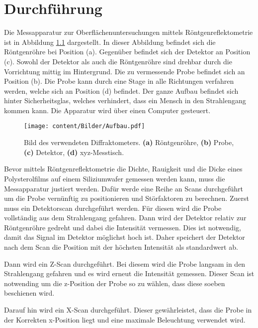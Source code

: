 \chapter{Durchführung}
\label{cha:Durchführung}

Die Messapparatur zur Oberflächenuntersuchungen mittels Röntgenreflektometrie ist in Abbildung \ref{fig:Aufbau} dargestellt. In dieser Abbildung befindet sich die Röntgenröhre bei 
Position (a). Gegenüber befindet sich der Detektor an Position (c). Sowohl der Detektor als auch die Röntgenröhre sind drehbar durch die Vorrichtung mittig im Hintergrund. 
Die zu vermessende Probe befindet sich an Position (b). Die Probe kann durch eine Stage in alle Richtungen verfahren werden, welche sich an Position (d) befindet. Der ganze Aufbau 
befindet sich hinter Sicherheitsglas, welches verhindert, dass ein Mensch in den Strahlengang kommen kann. Die Apparatur wird über einen Computer gesteuert.  

\begin{figure}
    \centering
    \texttt{[image: content/Bilder/Aufbau.pdf]}
    \caption{Bild des verwendeten Diffraktometers. \textbf{(a)} Röntgenröhre, \textbf{(b)} Probe, \textbf{(c)} Detektor, \textbf{(d)} xyz-Messtisch.}
    \label{fig:Aufbau}
\end{figure}

Bevor mittels Röntgenreflektometrie die Dichte, Rauigkeit und die Dicke eines Polysterolfilms auf einem Siliziumwafer gemessen werden kann, muss die Messapparatur justiert werden. 
Dafür werde eine Reihe an Scans durchgeführt um die Probe vernünftig zu positionieren und Störfaktoren zu berechnen. Zuerst muss ein Detektorscan durchgeführt werden. Für diesen 
wird die Probe vollständig aus dem Strahlengang gefahren. Dann wird der Detektor relativ zur Röntgenröhre gedreht und dabei die Intensität vermessen. Dies ist notwendig, damit das 
Signal im Detektor möglichst hoch ist. Daher speichert der Detektor nach dem Scan die Position mit der höchsten Intensität als standardwert ab. 

Dann wird ein Z-Scan durchgeführt. Bei diesem wird die Probe langsam in den Strahlengang gefahren und es wird erneut die Intensität gemessen. Dieser Scan ist notwending um die 
z-Position der Probe so zu wählen, dass diese soeben beschienen wird.

Darauf hin wird ein X-Scan durchgeführt. Dieser gewährleistet, dass die Probe in der Korrekten x-Position liegt und eine maximale Beleuchtung verwendet wird. 

